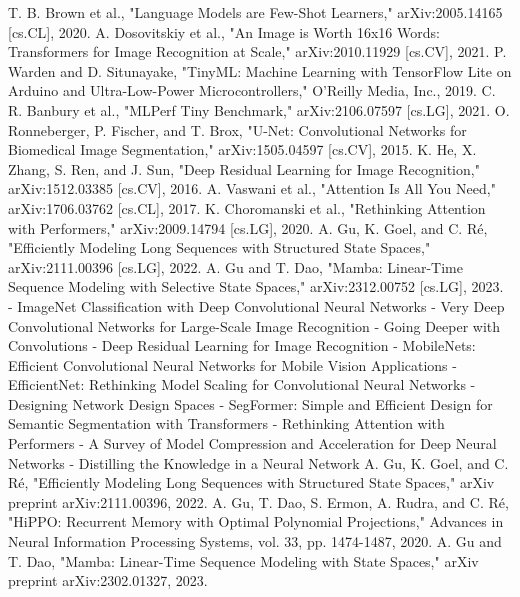 \documentclass[conference]{IEEEtran}
\begin{document}
\begin{thebibliography}{00}
     T. B. Brown et al., "Language Models are Few-Shot Learners," arXiv:2005.14165 [cs.CL], 2020.
     A. Dosovitskiy et al., "An Image is Worth 16x16 Words: Transformers for Image Recognition at Scale," arXiv:2010.11929 [cs.CV], 2021.
     P. Warden and D. Situnayake, "TinyML: Machine Learning with TensorFlow Lite on Arduino and Ultra-Low-Power Microcontrollers," O'Reilly Media, Inc., 2019.
     C. R. Banbury et al., "MLPerf Tiny Benchmark," arXiv:2106.07597 [cs.LG], 2021.
     O. Ronneberger, P. Fischer, and T. Brox, "U-Net: Convolutional Networks for Biomedical Image Segmentation," arXiv:1505.04597 [cs.CV], 2015.
     K. He, X. Zhang, S. Ren, and J. Sun, "Deep Residual Learning for Image Recognition," arXiv:1512.03385 [cs.CV], 2016.
     A. Vaswani et al., "Attention Is All You Need," arXiv:1706.03762 [cs.CL], 2017.
     K. Choromanski et al., "Rethinking Attention with Performers," arXiv:2009.14794 [cs.LG], 2020.
     A. Gu, K. Goel, and C. Ré, "Efficiently Modeling Long Sequences with Structured State Spaces," arXiv:2111.00396 [cs.LG], 2022.
     A. Gu and T. Dao, "Mamba: Linear-Time Sequence Modeling with Selective State Spaces," arXiv:2312.00752 [cs.LG], 2023.
     - ImageNet Classification with Deep Convolutional Neural Networks
     - Very Deep Convolutional Networks for Large-Scale Image Recognition
     - Going Deeper with Convolutions
     - Deep Residual Learning for Image Recognition
     - MobileNets: Efficient Convolutional Neural Networks for Mobile Vision Applications
     - EfficientNet: Rethinking Model Scaling for Convolutional Neural Networks
     - Designing Network Design Spaces
     - SegFormer: Simple and Efficient Design for Semantic Segmentation with Transformers
     - Rethinking Attention with Performers
     - A Survey of Model Compression and Acceleration for Deep Neural Networks
     - Distilling the Knowledge in a Neural Network
     A. Gu, K. Goel, and C. Ré, "Efficiently Modeling Long Sequences with Structured State Spaces," arXiv preprint arXiv:2111.00396, 2022.
     A. Gu, T. Dao, S. Ermon, A. Rudra, and C. Ré, "HiPPO: Recurrent Memory with Optimal Polynomial Projections," Advances in Neural Information Processing Systems, vol. 33, pp. 1474-1487, 2020.
     A. Gu and T. Dao, "Mamba: Linear-Time Sequence Modeling with State Spaces," arXiv preprint arXiv:2302.01327, 2023.


\end{thebibliography}
\end{document}
